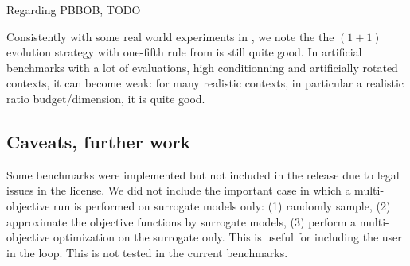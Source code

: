 Regarding PBBOB, TODO

Consistently with some real world experiments in \cite{micropredictions1,micropredictions2}, we note the the $(1+1)$ evolution strategy with one-fifth rule from \cite{rechenberg73} is still quite good. In artificial benchmarks with a lot of evaluations, high conditionning and artificially rotated contexts, it can become weak: for many realistic contexts, in particular a realistic ratio budget/dimension, it is quite good.

\subsection{Caveats, further work}
Some benchmarks were implemented but not included in the release due to legal issues in the license. 
We did not include the important case in which a multi-objective run is performed on surrogate models only: (1) randomly sample, (2) approximate the objective functions by surrogate models, (3) perform a multi-objective optimization on the surrogate only. This is useful for including the user in the loop. This is not tested in the current benchmarks.

